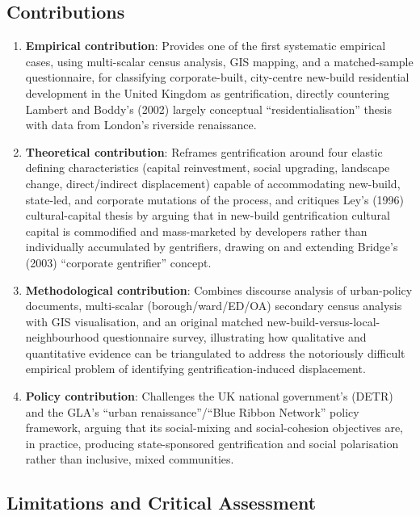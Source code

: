 \subsection*{Contributions}

\begin{enumerate}
  \item \textbf{Empirical contribution}: Provides one of the first systematic empirical cases, using multi-scalar census analysis, GIS mapping, and a matched-sample questionnaire, for classifying corporate-built, city-centre new-build residential development in the United Kingdom as gentrification, directly countering Lambert and Boddy's (2002) largely conceptual ``residentialisation'' thesis with data from London's riverside renaissance.
  \item \textbf{Theoretical contribution}: Reframes gentrification around four elastic defining characteristics (capital reinvestment, social upgrading, landscape change, direct/indirect displacement) capable of accommodating new-build, state-led, and corporate mutations of the process, and critiques Ley's (1996) cultural-capital thesis by arguing that in new-build gentrification cultural capital is commodified and mass-marketed by developers rather than individually accumulated by gentrifiers, drawing on and extending Bridge's (2003) ``corporate gentrifier'' concept.
  \item \textbf{Methodological contribution}: Combines discourse analysis of urban-policy documents, multi-scalar (borough/ward/ED/OA) secondary census analysis with GIS visualisation, and an original matched new-build-versus-local-neighbourhood questionnaire survey, illustrating how qualitative and quantitative evidence can be triangulated to address the notoriously difficult empirical problem of identifying gentrification-induced displacement.
  \item \textbf{Policy contribution}: Challenges the UK national government's (DETR) and the GLA's ``urban renaissance''/``Blue Ribbon Network'' policy framework, arguing that its social-mixing and social-cohesion objectives are, in practice, producing state-sponsored gentrification and social polarisation rather than inclusive, mixed communities.
\end{enumerate}

\subsection*{Limitations and Critical Assessment}

